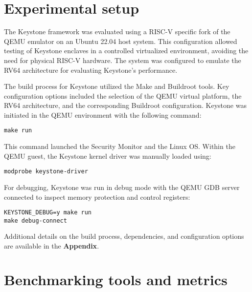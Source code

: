 \section{Experimental setup}

The Keystone framework was evaluated using a RISC-V specific fork of the QEMU emulator on an Ubuntu 22.04 host system. This configuration allowed testing of Keystone enclaves in a controlled virtualized environment, avoiding the need for physical RISC-V hardware. The system was configured to emulate the RV64 architecture for evaluating Keystone’s performance.

The build process for Keystone utilized the Make and Buildroot tools. Key configuration options included the selection of the QEMU virtual platform, the RV64 architecture, and the corresponding Buildroot configuration. Keystone was initiated in the QEMU environment with the following command:

\begin{verbatim}
make run
\end{verbatim}

This command launched the Security Monitor and the Linux OS. Within the QEMU guest, the Keystone kernel driver was manually loaded using:

\begin{verbatim}
modprobe keystone-driver
\end{verbatim}

For debugging, Keystone was run in debug mode with the QEMU GDB server connected to inspect memory protection and control registers:

\begin{verbatim}
KEYSTONE_DEBUG=y make run
make debug-connect
\end{verbatim}

Additional details on the build process, dependencies, and configuration options are available in the \textbf{Appendix}.

\section{Benchmarking tools and metrics}

